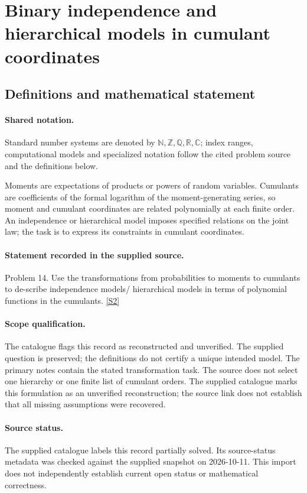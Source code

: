 \documentclass[11pt]{article}
\newcommand{\sref}[2]{\hyperlink{source:#1:#2}{[S#2]}}
\begin{document}
\section{Binary independence and hierarchical models in cumulant coordinates}\label{statement}

\subsection{Definitions and mathematical statement}

\paragraph{Shared notation.}Standard number systems are denoted by $\mathbb N,\mathbb Z,\mathbb Q,\mathbb R,\mathbb C$; index ranges, computational models and specialized notation follow the cited problem source and the definitions below.


Moments are expectations of products or powers of random variables. Cumulants are coefficients of the formal logarithm of the moment-generating series, so moment and cumulant coordinates are related polynomially at each finite order. An independence or hierarchical model imposes specified relations on the joint law; the task is to express its constraints in cumulant coordinates.
\paragraph{Statement recorded in the supplied source.}
Problem 14. Use the transformations from probabilities to moments to cumulants to de-scribe independence models/ hierarchical models in terms of polynomial functions in the cumulants. \sref{statement}{2}
\paragraph{Scope qualification.}
The catalogue flags this record as reconstructed and unverified. The supplied question is preserved; the definitions do not certify a unique intended model. The primary notes contain the stated transformation task. The source does not select one hierarchy or one finite list of cumulant orders.
The supplied catalogue marks this formulation as an unverified reconstruction; the source link does not establish that all missing assumptions were recovered.
\paragraph{Source status.}
The supplied catalogue labels this record partially solved. Its source-status metadata was checked against the supplied snapshot on 2026-10-11. This import does not independently establish current open status or mathematical correctness.
\end{document}
